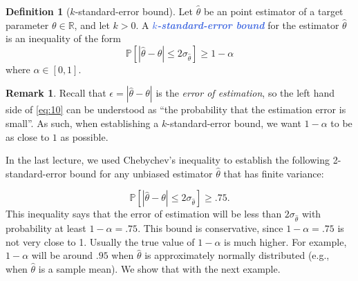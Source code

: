 \documentclass[10pt]{article}
\theoremstyle{definition}
\newtheorem{definition}[theorem]{Definition}
\newtheorem{remark}[theorem]{Remark}
\newcommand{\1}[1]{\textbf{1}_{\left[#1\right]}} %
\def\R{\mathbb{R}} %
\def\P{\mathbb{P}} %
\newcommand{\demph}[1]{\textcolor{RoyalBlue}{\textbf{\slshape #1}}} %
\begin{document}
\begin{definition}[$k$-standard-error bound]
  Let $\widehat{\theta}$ be an point estimator of a target parameter
  $\theta\in \R$, and let $k>0$. A \demph{$k$-standard-error bound} for the
  estimator $\widehat{\theta}$ is an inequality of the form
  \begin{equation}\label{eq:10}
    \P\left[|\widehat{\theta}-\theta| \leq 2\sigma_{\widehat{\theta}}\right]
    \geq 1-\alpha
  \end{equation}
  where $\alpha\in [0,1]$.
\end{definition}
\begin{remark}
  Recall that $\epsilon=|\widehat{\theta}-\theta|$ is the \textit{error of
    estimation}, so the left hand side of \cref{eq:10} can be understood as
  ``the probability that the estimation error is small''. As such, when
  establishing a $k$-standard-error bound, we want $1-\alpha$ to be as close to $1$ as
  possible.
\end{remark}

In the last lecture, we used Chebychev's inequality to establish the following
2-standard-error bound for any unbiased estimator $\widehat{\theta}$ that has
finite variance:

\begin{equation}\label{eq:9}
  \P\left[|\widehat{\theta}-\theta| \leq 2\sigma_{\widehat{\theta}}\right] \geq .75.
\end{equation}
This inequality says that the error of estimation will be less than
$2\sigma_{\widehat{\theta}}$ with probability at least $1-\alpha=.75$. This
bound is conservative, since $1-\alpha=.75$ is not very close to 1. Usually
the true value of $1-\alpha$ is much higher. For example, $1-\alpha$ will be
around $.95$ when $\widehat{\theta}$ is approximately normally distributed
(e.g., when $\widehat{\theta}$ is a sample mean). We show that with the next
example.
\end{document}
